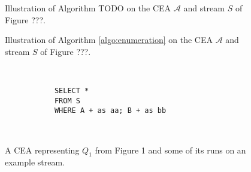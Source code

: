 \begin{figure}[H]
  \centering
  \begin{subfigure}[t]{0.1\linewidth}
  \end{subfigure}
  \begin{subfigure}[t]{0.1\linewidth}
  \end{subfigure}
  \begin{subfigure}[t]{0.24\linewidth}
  \end{subfigure}
  \begin{subfigure}[t]{0.24\linewidth}
  \end{subfigure}
  \begin{subfigure}[t]{0.28\linewidth}
  \end{subfigure}
  \caption{Illustration of Algorithm TODO on the CEA $\mathcal{A}$ and stream $S$ of Figure ???.}
  \label{fig:label}
\end{figure}

\begin{figure}[H]
  \centering
  \begin{subfigure}[t]{0.24\linewidth}
  \end{subfigure}
  \begin{subfigure}[t]{0.24\linewidth}
  \end{subfigure}
  \begin{subfigure}[t]{0.24\linewidth}
  \end{subfigure}
  \begin{subfigure}[t]{0.24\linewidth}
  \end{subfigure}
  \caption{Illustration of Algorithm \ref{algo:enumeration} on the CEA $\mathcal{A}$ and stream $S$ of Figure ???.}
  \label{fig:label}
\end{figure}

\begin{figure}[H]
  \centering
  \begin{subfigure}[t]{\textwidth}
    \centering
  \end{subfigure}
  \\
  \begin{subfigure}[b]{\textwidth}
    \begin{verbatim}
      SELECT *
      FROM S
      WHERE A + as aa; B + as bb
    \end{verbatim}
  \end{subfigure}
  \\
  \begin{subfigure}[b]{\textwidth}
    \centering
  \end{subfigure}
  \caption{A CEA representing $Q_{1}$ from Figure 1 and some of its runs on an example stream.}
  \label{fig:label}
\end{figure}

